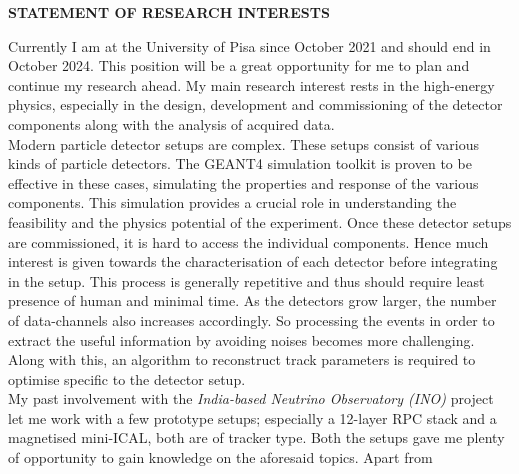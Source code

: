 \documentclass[12pt]{article}
\begin{document}
\pagebreak
\vspace{0.4cm}
\colorbox{gray!40}{\begin{minipage}{16.2cm}
\bf { STATEMENT OF RESEARCH INTERESTS} 
\end{minipage} }

\begin{justify}

  Currently I am at the University of Pisa since October 2021 and should end in October 2024.
  This position will be a great opportunity for me to plan and continue my research ahead.
  My main research interest rests in the high-energy physics, especially
  in the design, development and commissioning of the detector components
  along with the analysis of acquired data.\\
  \hspace*{0.6cm}
  Modern particle detector setups are complex. These
  setups consist of various kinds of particle detectors.
  The GEANT4 simulation toolkit is proven to be effective in these
  cases, simulating the properties and response of the various
  components. This simulation provides a crucial role in understanding
  the feasibility and the physics potential of the experiment.
  Once these detector setups are commissioned, it is hard to access the
  individual components. Hence much interest is given towards the
  characterisation of each detector before integrating in the setup.
  This process is generally repetitive and thus should require least
  presence of human and minimal time.
  As the detectors grow larger, the number of data-channels also
  increases accordingly. So processing the events in order to extract
  the useful information by avoiding noises
  becomes more challenging. Along with this, an algorithm to reconstruct
  track parameters is required to optimise specific to the detector
  setup.\\
  \hspace*{0.6cm}
  My past involvement with the {\it India-based Neutrino Observatory (INO)} project
  let me work with a few prototype setups; especially
  a 12-layer RPC stack and a magnetised
  mini-ICAL, both are of tracker type. Both the setups gave me plenty of
  opportunity to gain knowledge on the aforesaid topics. Apart from

\end{justify}
\end{document}
